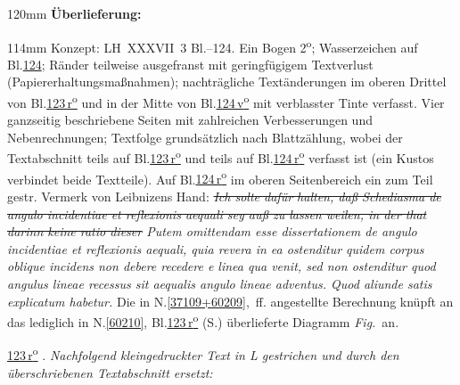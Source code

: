 %
\frenchspacing%
\begin{ledgroupsized}[r]{120mm}%
\footnotesize%
\pstart%
\noindent\textbf{Überlieferung:}%
\pend%
\end{ledgroupsized}%
\begin{ledgroupsized}[r]{114mm}%
\footnotesize%
\pstart%
\parindent -6mm%
%
Konzept:
LH~XXXVII~3 Bl.--124.
Ein Bogen 2\textsuperscript{o};
Wasserzeichen auf Bl.\:\href{\Scan{LH_37_03_124wz}}{124};
Ränder teilweise ausgefranst mit geringfügigem Textverlust
(Papiererhaltungsmaßnahmen);
nachträgliche Textänderungen im oberen Drittel von Bl.\:\href{\Scan{LH_37_03_123r}}{123\,r\textsuperscript{o}}\! und in der Mitte von Bl.\:\href{\Scan{LH_37_03_124v}}{124\,v\textsuperscript{o}}\! mit verblasster Tinte verfasst.
Vier ganzseitig beschriebene Seiten
mit zahlreichen Verbesserungen und Nebenrechnungen;
Textfolge grundsätzlich nach Blattzählung,
wobei der Textabschnitt 
teils auf Bl.\:\href{\Scan{LH_37_03_123r}}{123\,r\textsuperscript{o}}\! und
teils auf Bl.\:\href{\Scan{LH_37_03_124r}}{124\,r\textsuperscript{o}}\! verfasst ist
(ein Kustos verbindet beide Textteile).
Auf Bl.\:\href{\Scan{LH_37_03_124r}}{124\,r\textsuperscript{o}}\! im oberen Seitenbereich
ein zum Teil gestr. Vermerk von Leibnizens Hand:
\textit{%
\sout{%
Ich solte dafür halten, daß Schediasma de angulo incidentiae et reflexionis aequali sey auß zu lassen weilen, in der that darinn keine ratio dieser%
}
Putem omittendam esse dissertationem de angulo incidentiae et reflexionis aequali, quia revera in ea ostenditur quidem corpus oblique incidens non debere recedere e linea qua venit, sed non ostenditur quod angulus lineae recessus sit aequalis angulo lineae adventus. Quod aliunde satis explicatum habetur.%
}
Die in N.\:\ref{37109+60209}, \!\,ff. angestellte Berechnung knüpft an das lediglich in N.\:\ref{60210}, Bl.\:\href{\Scan{LH_37_03_123r}}{123\,r\textsuperscript{o}}\! (S.\:\pageref{LH_37_03_123-124_123r_Fig1})
überlieferte Diagramm \lbrack\textit{Fig.}\rbrack\ an.
\pend%
\end{ledgroupsized}%
%
\frenchspacing%
\vspace{8mm}%
\normalsize%
\pstart%
\noindent%
\lbrack%
\href{\Scan{LH_37_03_123r}}%
{123\,r\textsuperscript{o}}%
\!.
\textit{Nachfolgend kleingedruckter Text in L gestrichen und durch den überschriebenen Textabschnitt  ersetzt:}%
